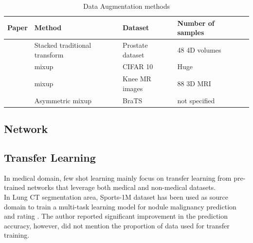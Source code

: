 \begin{table}
\begin{tabular}{lllll}
\hline
Paper                                             & Method                        & Dataset              & Number of samples &  \\
\hline
\cite{zhang_when_2019}       & Stacked traditional transform & Prostate dataset     & 48 4D volumes     &  \\
\cite{zhang_mixup_2018}       & mixup                         & CIFAR 10             & Huge              &  \\
\cite{panfilov_improving_2019} & mixup                         & Knee MR images       & 88 3D MRI         &  \\
\cite{li_overfitting_2019}   & Asymmetric mixup              & BraTS               &  not specified             &  \\
\hline
\end{tabular}
\caption{Data Augmentation methods}
\label{tab:Augtable}
\end{table}

\subsection{Network}

\subsection{Transfer Learning}
In medical domain, few shot learning mainly focus on transfer learning from pre-trained networks that leverage both medical and non-medical datasets.\\


In Lung CT segmentation area, Sports-1M dataset has been used as source domain to train a multi-task learning model for nodule malignancy prediction and rating \cite{hussein_risk_2017}. The author reported significant improvement in the prediction accuracy, however, did not mention the proportion of data used for transfer training.\\


